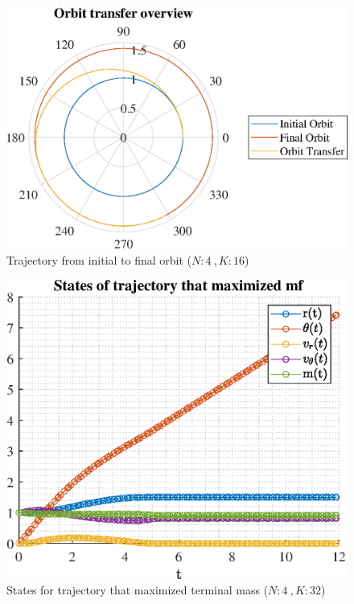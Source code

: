 \documentclass[]{article}
\begin{document}
	\begin{figure}
		\centering
		\includegraphics[scale=0.75]{orbit_N4_K16_C2_mf.eps}
		\caption{Trajectory from initial to final orbit (\(N:4\ , K:16\))}
		\label{fig:orbit_N4_K16_C2_mf}
	\end{figure}
	\begin{figure}
		\centering
		\includegraphics[scale=0.75]{states_N4_K32_C2_mf.eps}
		\caption{States for trajectory that maximized terminal mass (\(N:4\ , K:32\))}
		\label{fig:states_N4_K32_C2_mf}
	\end{figure}
\end{document}
